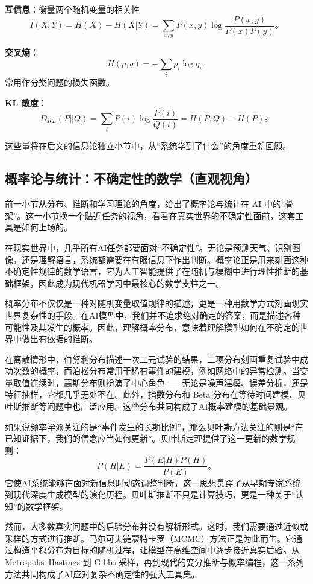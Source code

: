 \textbf{互信息}：衡量两个随机变量的相关性
$$
I(X;Y) = H(X) - H(X|Y) = \sum_{x,y} P(x,y) \log \frac{P(x,y)}{P(x)P(y)}。
$$

\textbf{交叉熵}：
$$
H(p,q) = -\sum_{i} p_i \log q_i,
$$
常用作分类问题的损失函数。

\textbf{KL 散度}：
$$
D_{KL}(P||Q) = \sum_{i} P(i) \log \frac{P(i)}{Q(i)} = H(P,Q) - H(P)。
$$

这些量将在后文的信息论独立小节中，从“系统学到了什么”的角度重新回顾。

\subsection{概率论与统计：不确定性的数学（直观视角）}

前一小节从分布、推断和学习理论的角度，给出了概率论与统计在 AI 中的“骨架”。这一小节换一个贴近任务的视角，看看在真实世界的不确定性面前，这套工具是如何上场的。

在现实世界中，几乎所有AI任务都要面对“不确定性”。无论是预测天气、识别图像，还是理解语言，系统都需要在有限信息下作出判断。概率论正是用来刻画这种不确定性规律的数学语言，它为人工智能提供了在随机与模糊中进行理性推断的基础框架，因此成为现代机器学习中最核心的数学支柱之一。

概率分布不仅仅是一种对随机变量取值规律的描述，更是一种用数学方式刻画现实世界复杂性的手段。在AI模型中，我们并不追求绝对确定的答案，而是描述各种可能性及其发生的概率。因此，理解概率分布，意味着理解模型如何在不确定的世界中做出有依据的推断。

在离散情形中，伯努利分布描述一次二元试验的结果，二项分布刻画重复试验中成功次数的概率，而泊松分布常用于稀有事件的建模，例如网络中的异常检测。当变量取值连续时，高斯分布则扮演了中心角色——无论是噪声建模、误差分析，还是特征抽样，它都几乎无处不在。此外，指数分布和 Beta 分布在等待时间建模、贝叶斯推断等问题中也广泛应用。这些分布共同构成了AI概率建模的基础景观。

如果说频率学派关注的是“事件发生的长期比例”，那么贝叶斯方法关注的则是“在已知证据下，我们的信念应当如何更新”。贝叶斯定理提供了这一更新的数学规则：
$$
P(H|E) = \frac{P(E|H)P(H)}{P(E)}。
$$
它使AI系统能够在面对新信息时动态调整判断，这一思想贯穿了从早期专家系统到现代深度生成模型的演化历程。贝叶斯推断不只是计算技巧，更是一种关于“认知”的数学框架。

然而，大多数真实问题中的后验分布并没有解析形式。这时，我们需要通过近似或采样的方式进行推断。马尔可夫链蒙特卡罗（MCMC）方法正是为此而生。它通过构造平稳分布为目标的随机过程，让模型在高维空间中逐步接近真实后验。从 Metropolis–Hastings 到 Gibbs 采样，再到现代的变分推断与概率编程，这一系列方法共同构成了AI应对复杂不确定性的强大工具集。

